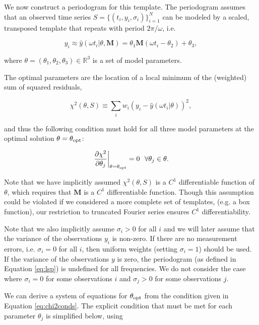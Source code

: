 \documentclass[apj]{emulateapj}
\begin{document}
We now construct a periodogram for this template. The periodogram assumes
that an observed time series $S = \{(t_i, y_i, \sigma_i)\}_{i=1}^N$ can be modeled
by a scaled, transposed template that repeats with period $2\pi / \omega$, i.e.

\begin{equation}
y_i \approx \hat{y}(\omega t_i|\theta, \mathbf{M}) = \theta_1\mathbf{M}(\omega t_i - \theta_2) + \theta_3,
\end{equation}

\noindent where $\theta = (\theta_1, \theta_2, \theta_3)\in \mathbb{R}^3$ is a set of model parameters.

The optimal parameters are the location of a local minimum of the (weighted) sum of
squared residuals,

\begin{equation}
    \chi^2(\theta, S) \equiv \sum_i w_i (y_i - \hat{y}(\omega t_i|\theta) )^2,
\end{equation}

\noindent and thus the following condition must hold for all three model parameters at
the optimal solution $\theta=\theta_{\rm opt}$:

\begin{equation}\label{eq:chi2conds}
    \left.\frac{\partial\chi^2}{\partial\theta_j}\right|_{\theta=\theta_{\rm opt}} = 0~~\forall\theta_j\in\theta.
\end{equation}

Note that we have implicitly assumed $\chi^2(\theta,S)$ is a $C^1$ differentiable
function of $\theta$, which requires that $\mathbf{M}$ is a
$C^1$ differentiable function. Though this assumption could be violated if we
considered a more complete set of templates, (e.g. a box function), our restriction
to truncated Fourier series ensures $C^1$ differentiability.

Note that we also implicitly assume $\sigma_i > 0$ for all $i$ and we will later
assume that the variance of the observations $y_i$ is non-zero. If there are no
measurement errors, i.e. $\sigma_i = 0$ for all $i$, then uniform weights
(setting $\sigma_i = 1$) should be used. If the variance of the observations $y$
is zero, the periodogram (as defined in Equation \ref{eq:lsp}) is undefined for all frequencies. We do not
consider the case where $\sigma_i = 0$ for some observations $i$ and $\sigma_j > 0$ for
some observations $j$.

We can derive a system of equations for $\theta_{\rm opt}$ from the condition given
in Equation \ref{eq:chi2conds}. The explicit condition that must be met for each parameter $\theta_j$ is simplified below,
using
\end{document}
